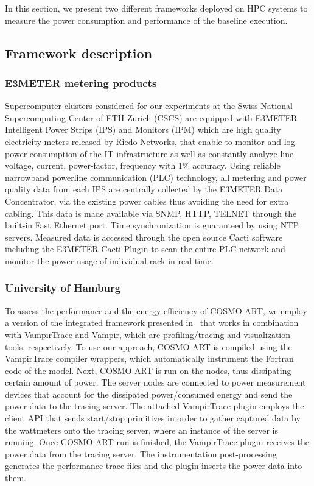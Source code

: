 In this section,  we present two different frameworks  deployed on HPC
systems  to  measure the  power  consumption  and  performance of  the
baseline execution. 

\subsection{Framework description}
\label{subsec:3.1}

\subsubsection{E3METER metering products}
Supercomputer  clusters considered  for our  experiments at  the Swiss
National Supercomputing Center of  ETH Zurich (CSCS) are equipped with
E3METER Intelligent  Power Strips (IPS)  and Monitors (IPM)  which are
high  quality  electricity meters  released  by  Riedo Networks,  that
enable to monitor  and log power consumption of  the IT infrastructure
as  well as  constantly analyze  line voltage,  current, power-factor,
frequency  with  1\% accuracy.   Using  reliable narrowband  powerline
communication (PLC)  technology, all  metering and power  quality data
from   each  IPS  are   centrally  collected   by  the   E3METER  Data
Concentrator, via the existing power cables thus avoiding the need for
extra cabling.   This data  is made available  via SNMP,  HTTP, TELNET
through  the built-in  Fast  Ethernet port.   Time synchronization  is
guaranteed by  using NTP servers.   Measured data is  accessed through
the open source  Cacti software including the E3METER  Cacti Plugin to
scan the entire PLC network  and monitor the power usage of individual
rack in real-time.

\subsubsection{University of Hamburg}
To assess the  performance and the energy efficiency  of COSMO-ART, we
employ   a    version   of   the    integrated   framework   presented
in~\cite{energy13}  that  works in  combination  with VampirTrace  and
Vampir,   which  are   profiling/tracing   and  visualization   tools,
respectively.
To  use our  approach,  COSMO-ART is  compiled  using the  VampirTrace
compiler wrappers, which automatically  instrument the Fortran code of
the  model. Next,  COSMO-ART is  run  on the  nodes, thus  dissipating
certain  amount of  power.  The  server nodes  are connected  to power
measurement  devices that  account for  the  dissipated power/consumed
energy and  send the power data  to the tracing  server.  The attached
VampirTrace \pmlib plugin employs the client API that sends start/stop
primitives in order to gather captured data by the wattmeters onto the
tracing server,  where an  instance of the  \pmlib server  is running.
Once COSMO-ART run is finished, the VampirTrace \pmlib plugin receives
the  power   data  from  the  tracing   server.   The  instrumentation
post-processing generates  the performance trace files  and the \pmlib
plugin inserts the power data into them.

